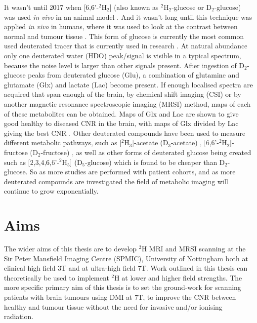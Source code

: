 \documentclass[class=article, crop=false]{standalone}
\begin{document}
It wasn't until 2017 when [6,6'-$^2$H$_2$] (also known as $^2$H$_2$-glucose or D$_2$-glucose) was used \textit{in vivo} in an animal model \cite{Lu2017QuantitativeSpectroscopy}. And it wasn't long until this technique was applied \textit{in vivo} in humans, where it was used to look at the contrast between normal and tumour tissue \cite{DeFeyter2018DeuteriumVivo}. This form of glucose is currently the most common used deuterated tracer that is currently used in research \cite{DeFeyter2018DeuteriumVivo,DeFeyter2021DeuteriumFuture,Ruhm2022Dynamic9.4T,Roig2022Deuterium7T,deGraaf2020OnImaging}. At natural abundance only one deuterated water (HDO) peak/signal is visible in a typical spectrum, because the noise level is larger than other signals present. After ingestion of D$_2$-glucose peaks from deuterated glucose (Glu), a combination of glutamine and glutamate (Glx) and lactate (Lac) become present. If enough localised spectra are acquired that span enough of the brain, by chemical shift imaging (CSI) or by another magnetic resonance spectroscopic imaging (MRSI) method, maps of each of these metabolites can be obtained. Maps of Glx and Lac are shown to give good healthy to diseased CNR in the brain, with maps of Glx divided by Lac giving the best CNR \cite{DeFeyter2018DeuteriumVivo,Straathof2021DeuteriumBrain}. Other deuterated compounds have been used to measure different metabolic pathways, such as [$^2$H$_3$]-acetate (D$_3$-acetate) \cite{DeFeyter2018DeuteriumVivo,Rich20201HVivo}, [6,6'-$^2$H$_2$]-fructose (D$_2$-fructose) \cite{Zhang202366-2H2Cancer}, as well as other forms of deuterated glucose being created such as [2,3,4,6,6'-$^2$H$_5$] (D$_5$-glucose) \cite{Zou2023AImaging} which is found to be cheaper than D$_2$-glucose. So as more studies are performed with patient cohorts, and as more deuterated compounds are investigated the field of metabolic imaging will continue to grow exponentially. 


\section{Aims}

The wider aims of this thesis are to develop $^2$H MRI and MRSI scanning at the Sir Peter Mansfield Imaging Centre (SPMIC), University of Nottingham both at clinical high field 3T and at ultra-high field 7T. Work outlined in this thesis can theoretically be used to implement $^2$H at lower and higher field strengths. The more specific primary aim of this thesis is to set the ground-work for scanning patients with brain tumours using DMI at 7T, to improve the CNR between healthy and tumour tissue without the need for invasive and/or ionising radiation.
\end{document}
